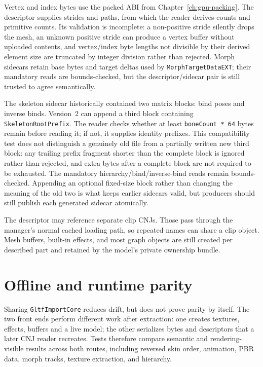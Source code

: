 Vertex and index bytes use the packed ABI from Chapter~\ref{ch:gpu-packing}. The descriptor
supplies strides and paths, from which the reader derives counts and primitive counts. Its
validation is incomplete: a non-positive stride silently drops the mesh, an unknown positive
stride can produce a vertex buffer without uploaded contents, and vertex/index byte lengths not
divisible by their derived element size are truncated by integer division rather than rejected.
Morph sidecars
retain base bytes and target deltas used by \texttt{MorphTargetDataEXT}; their mandatory reads are
bounds-checked, but the descriptor/sidecar pair is still trusted to agree semantically.

The skeleton sidecar historically contained two matrix blocks: bind poses and inverse binds.
Version~2 can append a third block containing \texttt{SkeletonRootPrefix}. The reader checks
whether at least \texttt{boneCount * 64} bytes remain before reading it; if not, it supplies
identity prefixes. This compatibility test does not distinguish a genuinely old file from a
partially written new third block: any trailing prefix fragment shorter than the complete block is
ignored rather than rejected, and extra bytes after a complete block are not required to be
exhausted. The mandatory hierarchy/bind/inverse-bind reads remain bounds-checked. Appending an
optional fixed-size block rather than changing the meaning of the old two is what keeps earlier
sidecars valid, but producers should still publish each generated sidecar atomically.

The descriptor may reference separate clip CNJs. Those pass through the manager's normal
cached loading path, so repeated names can share a clip object. Mesh buffers, built-in effects,
and most graph objects are still created per described part and retained by the model's private
ownership bundle.

\section{Offline and runtime parity}

Sharing \texttt{GltfImportCore} reduces drift, but does not prove parity by itself. The two
front ends perform different work after extraction: one creates textures, effects, buffers and
a live model; the other serializes bytes and descriptors that a later CNJ reader recreates.
Tests therefore compare semantic and rendering-visible results across both routes, including
reversed skin order, animation, PBR data, morph tracks, texture extraction, and hierarchy.

